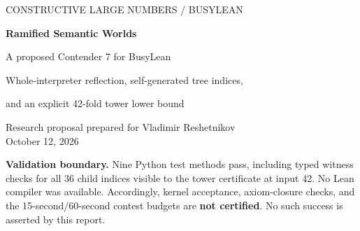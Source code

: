 \documentclass[11pt]{article}
\theoremstyle{definition}
\theoremstyle{remark}
\newcommand{\funiter}[2]{#1^{[#2]}}
\begin{document}
\begin{center}
{\small\sffamily\color{accent}CONSTRUCTIVE LARGE NUMBERS \quad / \quad BUSYLEAN}
\vspace{0.7em}

{\LARGE\bfseries\color{ink}Ramified Semantic Worlds\par}
\vspace{0.3em}
{\Large A proposed Contender 7 for BusyLean\par}
\vspace{0.6em}
{\large Whole-interpreter reflection, self-generated tree indices,\par
and an explicit 42-fold tower lower bound\par}
\vspace{0.8em}
Research proposal prepared for Vladimir Reshetnikov\\
October 12, 2026
\end{center}

\begin{abstract}
The incumbent BusyLean construction reflects a finite-type W-language over
numeric oracle families and iterates this reflection along the trees the
language itself defines. We propose a further step: reflect \emph{entire
semantic worlds}. A world supplies a tree-recursion operator accepting an
arbitrary seed, an arbitrary countably branching well-founded tree, and a
natural argument, together with its own program-generated index. A new
language can access the complete operators and indices of a countable family
of previously constructed worlds. Its bounded program maximum and its own
tree index form a stronger world. We ramify this operation along the preceding
world's own index and repeat the resulting world transformation 42 times.
The resulting closed natural-number definition is computable in principle.
Writing $C_6$ for the incumbent and
$A(x)=\funiter{(u\mapsto 2^u)}{x}(x)$, we prove
\[
                 \boxed{\quad \funiter A{42}(C_6)<C_7.\quad}
\]
We also prove relative language domination, numerical non-representability,
and non-representability of the new tree index. The comparisons do not assume
monotonicity of an interpreter in its oracle. Lean definition and proof source,
an independent small witness evaluator, and reproducible audit scripts are
included. The mathematical argument is complete at the stated level; the
Lean source has not been compiled in this authoring environment.
\end{abstract}

\noindent\colorbox{pale}{\parbox{\dimexpr\linewidth-2\fboxsep\relax}{
\textbf{Validation boundary.} Nine Python test methods pass, including typed
witness checks for all 36 child indices visible to the tower certificate at
input 42. No Lean compiler was available. Accordingly, kernel acceptance,
axiom-closure checks, and the 15-second/60-second contest budgets are
\textbf{not certified}. No such success is asserted by this report.}}
\end{document}
